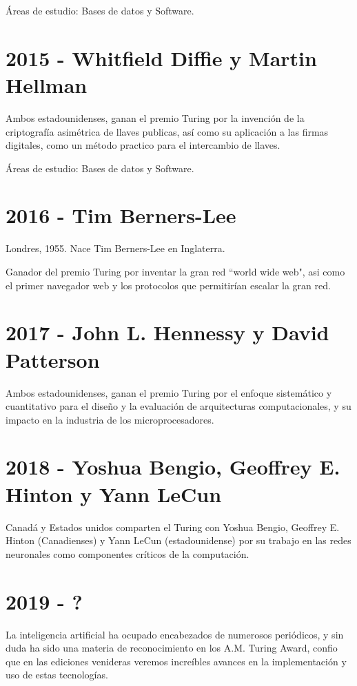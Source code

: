 \documentclass[notitlepage,letterpaper, 11pt]{article}
\begin{document}
\noindent Áreas de estudio: Bases de datos y Software.
\newline

\section*{2015 - Whitfield Diffie y Martin Hellman}
\noindent Ambos estadounidenses, ganan el premio Turing por la invención de la criptografía asimétrica de llaves publicas, así como su aplicación a las firmas digitales, como un método practico para el intercambio de llaves.

\noindent Áreas de estudio: Bases de datos y Software.
\newline

\section*{2016 - Tim Berners-Lee}
\noindent Londres, 1955. Nace Tim Berners-Lee en Inglaterra.

\noindent Ganador del premio Turing por inventar la gran red ``world wide web", asi como el primer navegador web y los protocolos que permitirían escalar la gran red.
\newline

\section*{2017 - John L. Hennessy y David Patterson}
\noindent Ambos estadounidenses, ganan el premio Turing por el enfoque sistemático y cuantitativo para el diseño y la evaluación de arquitecturas computacionales, y su impacto en la industria de los microprocesadores.
\newline


\section*{2018 - Yoshua Bengio, Geoffrey E. Hinton y Yann LeCun}
\noindent Canadá y Estados unidos comparten el Turing con Yoshua Bengio, Geoffrey E. Hinton (Canadienses) y Yann LeCun (estadounidense) por su trabajo en las redes neuronales como componentes críticos de la computación.
\newline

\section*{2019 - ?}
\noindent La inteligencia artificial ha ocupado encabezados de numerosos periódicos, y sin duda ha sido una materia de reconocimiento en los A.M. Turing Award, confio que en las ediciones venideras veremos increíbles avances en la implementación y uso de estas tecnologías. 
\newline
\end{document}
